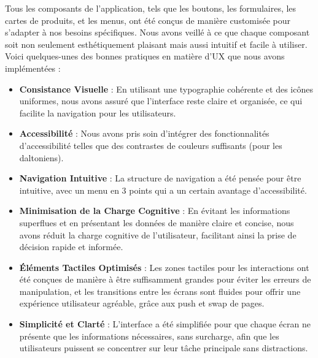 Tous les composants de l'application, tels que les boutons, les formulaires, les cartes de produits, et les menus, ont été conçus de manière customisée pour s'adapter à nos besoins spécifiques. Nous avons veillé à ce que chaque composant soit non seulement esthétiquement plaisant mais aussi intuitif et facile à utiliser. Voici quelques-unes des bonnes pratiques en matière d'UX que nous avons implémentées :

\begin{itemize}[noitemsep]
    \item \textbf{Consistance Visuelle} : En utilisant une typographie cohérente et des icônes uniformes, nous avons assuré que l'interface reste claire et organisée, ce qui facilite la navigation pour les utilisateurs.
    \item \textbf{Accessibilité} : Nous avons pris soin d'intégrer des fonctionnalités d'accessibilité telles que des contrastes de couleurs suffisants (pour les daltoniens).%

    \item \textbf{Navigation Intuitive} : La structure de navigation a été pensée pour être intuitive, avec un menu en 3 points qui a un certain avantage d'accessibilité.

    \item \textbf{Minimisation de la Charge Cognitive} : En évitant les informations superflues et en présentant les données de manière claire et concise, nous avons réduit la charge cognitive de l'utilisateur, facilitant ainsi la prise de décision rapide et informée.

    \item \textbf{Éléments Tactiles Optimisés} : Les zones tactiles pour les interactions ont été conçues de manière à être suffisamment grandes pour éviter les erreurs de manipulation, et les transitions entre les écrans sont fluides pour offrir une expérience utilisateur agréable, grâce aux push et swap de pages.

    \item \textbf{Simplicité et Clarté} : L'interface a été simplifiée pour que chaque écran ne présente que les informations nécessaires, sans surcharge, afin que les utilisateurs puissent se concentrer sur leur tâche principale sans distractions.


\end{itemize}
